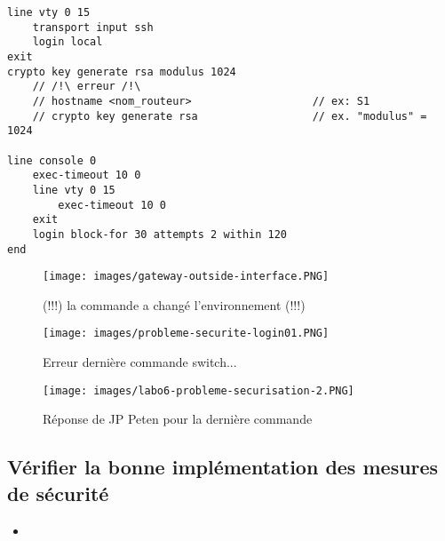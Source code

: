 \documentclass[a4paper]{article}
\begin{document}
\begin{itemize}
\begin{verbatim}
line vty 0 15
    transport input ssh
    login local
exit
crypto key generate rsa modulus 1024
    // /!\ erreur /!\
    // hostname <nom_routeur>                   // ex: S1
    // crypto key generate rsa                  // ex. "modulus" = 1024

line console 0
    exec-timeout 10 0
    line vty 0 15
        exec-timeout 10 0
    exit
    login block-for 30 attempts 2 within 120
end
\end{verbatim}




\end{itemize}





\begin{figure}[H]
    \centering
    \texttt{[image: images/gateway-outside-interface.PNG]}
    \caption{(!!!) la commande a changé l'environnement (!!!)}
    \label{}
\end{figure}

\begin{figure}[H]
    \centering
    \texttt{[image: images/probleme-securite-login01.PNG]}
    \caption{Erreur dernière commande switch...}
    \label{}
\end{figure}

\begin{figure}[H]
    \centering
    \texttt{[image: images/labo6-probleme-securisation-2.PNG]}
    \caption{Réponse de JP Peten pour la dernière commande}
    \label{}
\end{figure}










\subsection{Vérifier la bonne implémentation des mesures de sécurité}





\begin{itemize}




\item 





\end{itemize}
\end{document}
